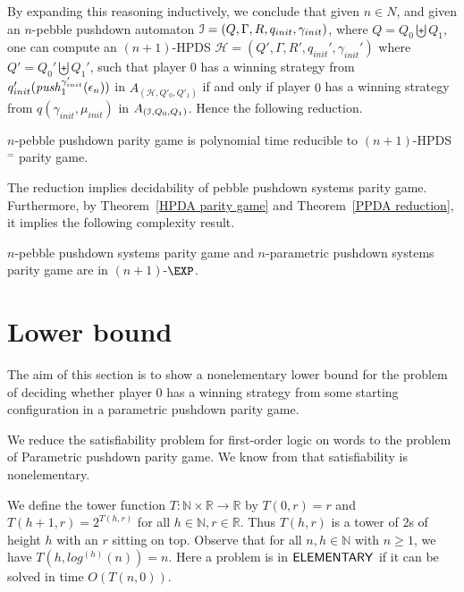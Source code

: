 \documentclass[a4paper,UKenglish,cleveref, autoref, thm-restate]{lipics-v2021}
\renewcommand{\R}{\mathbb{R}}
\renewcommand{\H}{\mathcal{H}}
\newcommand{\N}{\mathbb{N}}
\begin{document}
By expanding this reasoning inductively, we conclude that given $n \in N$, and
given an $n$-pebble pushdown automaton 
$\mathcal{I} = (Q, \Gamma, R, q_{init}, \gamma_{init})$, where $Q= Q_0 \biguplus Q_1$,
one can compute an $(n+1)$-HPDS 
$\H = (Q', \Gamma, R', q_{init}', \gamma_{init}')$  where $Q'= Q_0' \biguplus Q_1'$, 
such 
that 
player $0$ has a winning strategy from $q'_{init}(\text{\textit{push}}_1^{\gamma_{init}'}(\epsilon_{n}))$ in $A_{(\H,Q'_0,Q'_1)}$ 
if
and only if
player $0$ has a winning strategy from $q(\gamma_{init},\mu_{init})$ in $A_{(\mathcal{I},Q_0,Q_1)}$. 
Hence the following reduction.

\begin{theorem} 
{\sc $n$-pebble pushdown parity game} is polynomial time reducible
to {\sc $(n+1)$-HPDS$^=$ parity game}.
\end{theorem}

The reduction implies decidability of pebble pushdown systems parity game. Furthermore,
by Theorem~\ref{HPDA parity game} and Theorem~\ref{PPDA reduction}, it implies the following complexity result.


\begin{theorem}
{\sc $n$-pebble pushdown systems parity game} and {\sc $n$-parametric pushdown systems parity game} are in $(n+1)$-$\EXP$.
\end{theorem}












\section{Lower bound}

The aim of this section is to show a nonelementary lower bound for the 
problem of deciding whether player $0$ has a winning strategy from some starting configuration in
a parametric pushdown parity game.


We reduce the satisfiability problem for first-order logic on words
to the problem of {\sc Parametric pushdown parity game}. 
We know from \cite{Sto74}
that satisfiability is nonelementary. 
%


We define the tower function $T : \N \times \R \to \R$ by $T(0,r) =r$ and
$T(h+1,r)= 2^{T(h,r)}$ for all $h \in \N, r \in \R$. Thus $T(h,r)$ is a tower of $2$s of height $h$ with an $r$ sitting on top.
Observe that for all $n,h \in \N$ with $n\geq 1$, we have
$T(h, log^{(h)}(n)) = n$.
%
% 
Here a problem is in ${\sf ELEMENTARY}$ if it can be solved in time $O ( T(n, 0) )$.
\end{document}
